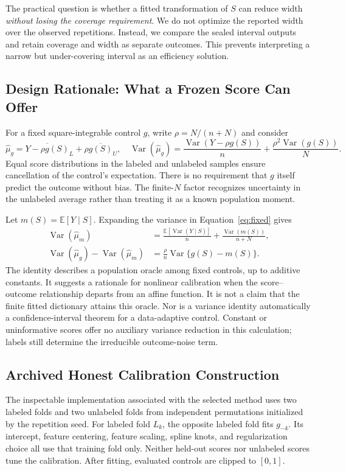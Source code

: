 \documentclass{article}
\newcommand{\E}{\mathbb{E}}
\newcommand{\Var}{\operatorname{Var}}
\begin{document}
The practical question is whether a fitted transformation of $S$ can reduce width \emph{without losing the coverage requirement}. We do not optimize the reported width over the observed repetitions. Instead, we compare the sealed interval outputs and retain coverage and width as separate outcomes. This prevents interpreting a narrow but under-covering interval as an efficiency solution.

\subsection{Design Rationale: What a Frozen Score Can Offer}
For a fixed square-integrable control $g$, write $\rho=N/(n+N)$ and consider
\begin{equation}
\widehat\mu_g=\overline{Y-\rho g(S)}_L+\rho\overline{g(S)}_U,
\quad
\Var(\widehat\mu_g)=\frac{\Var(Y-\rho g(S))}{n}
+\frac{\rho^2\Var(g(S))}{N}.
\label{eq:fixed}
\end{equation}
Equal score distributions in the labeled and unlabeled samples ensure cancellation of the control's expectation. There is no requirement that $g$ itself predict the outcome without bias. The finite-$N$ factor recognizes uncertainty in the unlabeled average rather than treating it as a known population moment.

Let $m(S)=\E[Y\mid S]$. Expanding the variance in Equation~\ref{eq:fixed} gives
\begin{align}
\Var(\widehat\mu_m)&=\frac{\E[\Var(Y\mid S)]}{n}
+\frac{\Var(m(S))}{n+N},\label{eq:oracle}\\
\Var(\widehat\mu_g)-\Var(\widehat\mu_m)
&=\frac{\rho}{n}\Var\{g(S)-m(S)\}.\label{eq:excess}
\end{align}
The identity describes a population oracle among fixed controls, up to additive constants. It suggests a rationale for nonlinear calibration when the score--outcome relationship departs from an affine function. It is not a claim that the finite fitted dictionary attains this oracle. Nor is a variance identity automatically a confidence-interval theorem for a data-adaptive control. Constant or uninformative scores offer no auxiliary variance reduction in this calculation; labels still determine the irreducible outcome-noise term.

\subsection{Archived Honest Calibration Construction}
The inspectable implementation associated with the selected method uses two labeled folds and two unlabeled folds from independent permutations initialized by the repetition seed. For labeled fold $L_k$, the opposite labeled fold fits $g_{-k}$. Its intercept, feature centering, feature scaling, spline knots, and regularization choice all use that training fold only. Neither held-out scores nor unlabeled scores tune the calibration. After fitting, evaluated controls are clipped to $[0,1]$.
\end{document}
